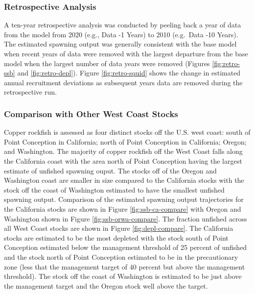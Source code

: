 \documentclass[11pt,
  english,
  a4paper,
]{article}
\begin{document}
\leavevmode\tagmcend\tagstructend\par


\hypertarget{retrospective-analysis}{%
\subsubsection{Retrospective Analysis}\label{retrospective-analysis}}

\leavevmode\tagmcend\tagstructend


A ten-year retrospective analysis was conducted by peeling back a year of data from the model from 2020 (e.g., Data -1 Years) to 2010 (e.g.~Data -10 Years). The estimated spawning output was generally consistent with the base model when recent years of data were removed with the largest departure from the base model when the largest number of data years were removed (Figures \ref{fig:retro-ssb} and \ref{fig:retro-depl}). Figure \ref{fig:retro-squid} shows the change in estimated annual recruitment deviations as subsequent years data are removed during the retrospective run.

\leavevmode\tagmcend\tagstructend\par


\hypertarget{comparison-with-other-west-coast-stocks}{%
\subsubsection{Comparison with Other West Coast Stocks}\label{comparison-with-other-west-coast-stocks}}

\leavevmode\tagmcend\tagstructend


Copper rockfish is assessed as four distinct stocks off the U.S. west coast: south of Point Conception in California; north of Point Conception in California; Oregon; and Washington. The majority of copper rockfish off the West Coast falls along the California coast with the area north of Point Conception having the largest estimate of unfished spawning ouput. The stocks off of the Oregon and Washington coast are smaller in size compared to the California stocks with the stock off the coast of Washington estimated to have the smallest unfished spawning output. Comparison of the estimated spawning output trajectories for the California stocks are shown in Figure \ref{fig:ssb-ca-compare} with Oregon and Washington shown in Figure \ref{fig:ssb-orwa-compare}. The fraction unfished across all West Coast stocks are shown in Figure \ref{fig:depl-compare}. The California stocks are estimated to be the most depleted with the stock south of Point Conception estimated below the management threshold of 25 percent of unfished and the stock north of Point Conception estimated to be in the precautionary zone (less that the management target of 40 percent but above the management threshold). The stock off the coast of Washington is estimated to be just above the management target and the Oregon stock well above the target.
\end{document}
